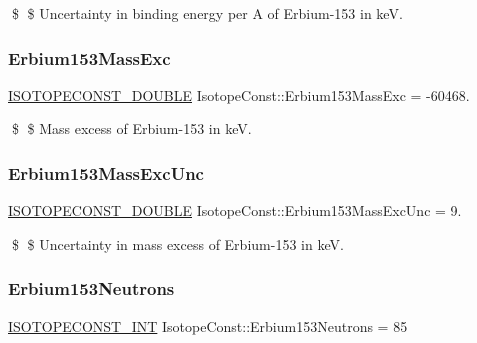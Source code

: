 \$ \$ Uncertainty in binding energy per A of Erbium-\/153 in keV. \mbox{\label{group___isotope_const-_erbium-_er153_gaa4aa47f10e05c18963b1ae737797284c}} 
\subsubsection{\texorpdfstring{Erbium153\+Mass\+Exc}{Erbium153MassExc}}
{\footnotesize\ttfamily \mbox{\hyperlink{group___isotope_const-_macros_ga8f45a7272ce02c0b4c65c44636ed719a}{I\+S\+O\+T\+O\+P\+E\+C\+O\+N\+S\+T\+\_\+\+D\+O\+U\+B\+LE}} Isotope\+Const\+::\+Erbium153\+Mass\+Exc = -\/60468.}

\$ \$ Mass excess of Erbium-\/153 in keV. \mbox{\label{group___isotope_const-_erbium-_er153_gab55d756b952e7222c17f6a344870721a}} 
\subsubsection{\texorpdfstring{Erbium153\+Mass\+Exc\+Unc}{Erbium153MassExcUnc}}
{\footnotesize\ttfamily \mbox{\hyperlink{group___isotope_const-_macros_ga8f45a7272ce02c0b4c65c44636ed719a}{I\+S\+O\+T\+O\+P\+E\+C\+O\+N\+S\+T\+\_\+\+D\+O\+U\+B\+LE}} Isotope\+Const\+::\+Erbium153\+Mass\+Exc\+Unc = 9.}

\$ \$ Uncertainty in mass excess of Erbium-\/153 in keV. \mbox{\label{group___isotope_const-_erbium-_er153_gae1d38ced7b91eb662387a87cec813269}} 
\subsubsection{\texorpdfstring{Erbium153\+Neutrons}{Erbium153Neutrons}}
{\footnotesize\ttfamily \mbox{\hyperlink{group___isotope_const-_macros_ga5f18360b3e99483a35c32d789e62621c}{I\+S\+O\+T\+O\+P\+E\+C\+O\+N\+S\+T\+\_\+\+I\+NT}} Isotope\+Const\+::\+Erbium153\+Neutrons = 85}

